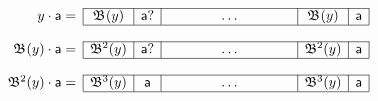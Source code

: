 \documentclass[11pt]{article}
\begin{document}
\TeXtoEPS
\(
\begin{array}{r@{}ccccc}
\cline{2-6}
  \multicolumn{1}{r|}{y \cdot \word{a} =}
& \multicolumn{1}{c|}{\Border{}{y}}
& \multicolumn{1}{c|}{\word{a}?}
& \phantom{HHHH}\ldots\phantom{HHHH}
& \multicolumn{1}{|c|}{\Border{}{y}}
& \multicolumn{1}{c|}{\word{a}}\\
\cline{2-6}
&&&&&\\
\cline{2-6}
  \multicolumn{1}{r|}{\Border{}{y} \cdot \word{a} =}
& \multicolumn{1}{c|}{\Border{2}{y}}
& \multicolumn{1}{c|}{\word{a}?}
& \ldots
& \multicolumn{1}{|c|}{\Border{2}{y}}
& \multicolumn{1}{c|}{\word{a}}\\
\cline{2-6}
&&&&&\\
\cline{2-6}
  \multicolumn{1}{r|}{\Border{2}{y} \cdot \word{a} =}
& \multicolumn{1}{c|}{\Border{3}{y}}
& \multicolumn{1}{c|}{\word{a}}
& \ldots
& \multicolumn{1}{|c|}{\Border{3}{y}}
& \multicolumn{1}{c|}{\word{a}}\\
\cline{2-6}
\end{array}
\)
\endTeXtoEPS
\end{document}
